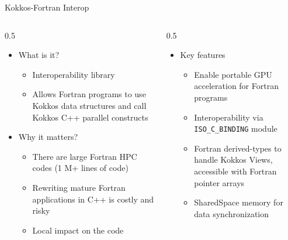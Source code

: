 \documentclass[
    aspectratio=169,
]{beamer}
\begin{document}
\begin{frame}{Kokkos-Fortran Interop}
    \begin{columns}
        \begin{column}{0.5\linewidth}
            \begin{itemize}
                \item What is it?
                \begin{itemize}
                    \item Interoperability library
                    \item Allows Fortran programs to use Kokkos data structures and call Kokkos C++ parallel constructs
                \end{itemize}
                \item Why it matters?
                \begin{itemize}
                    \item There are large Fortran HPC codes (1 M+ lines of code)
                    \item Rewriting mature Fortran applications in C++ is costly and risky
                    \item Local impact on the code
                \end{itemize}
            \end{itemize}
        \end{column}
        \begin{column}{0.5\linewidth}
            \begin{itemize}
                \item Key features
                \begin{itemize}
                    \item Enable portable GPU acceleration for Fortran programs
                    \item Interoperability via \texttt{ISO\_C\_BINDING} module
                    \item Fortran derived-types to handle Kokkos Views, accessible with Fortran pointer arrays
                    \item SharedSpace memory for data synchronization
                \end{itemize}
            \end{itemize}
        \end{column}
    \end{columns}
\end{frame}
\end{document}
